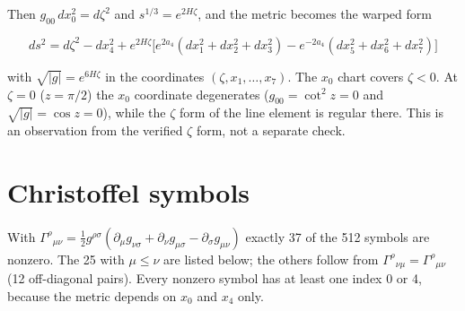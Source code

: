 \documentclass[11pt]{article}
\begin{document}
Then $g_{00}\,dx_0^2=d\zeta^2$ and $s^{1/3}=e^{2H\zeta}$, and the metric becomes the warped form

\[
ds^2=d\zeta^2-dx_4^2+e^{2H\zeta}\bigl[e^{2a_4}(dx_1^2+dx_2^2+dx_3^2)-e^{-2a_4}(dx_5^2+dx_6^2+dx_7^2)\bigr]
\]

with $\sqrt{|g|}=e^{6H\zeta}$ in the coordinates $(\zeta,x_1,\dots,x_7)$. The $x_0$ chart covers $\zeta<0$. At $\zeta=0$ ($z=\pi/2$) the $x_0$ coordinate degenerates ($g_{00}=\cot^2z=0$ and $\sqrt{|g|}=\cos z=0$), while the $\zeta$ form of the line element is regular there. This is an observation from the verified $\zeta$ form, not a separate check.

\section{Christoffel symbols}

With $\Gamma^\rho{}_{\mu\nu}=\tfrac12g^{\rho\sigma}(\partial_\mu g_{\nu\sigma}+\partial_\nu g_{\mu\sigma}-\partial_\sigma g_{\mu\nu})$ exactly 37 of the 512 symbols are nonzero. The 25 with $\mu\le\nu$ are listed below; the others follow from $\Gamma^\rho{}_{\nu\mu}=\Gamma^\rho{}_{\mu\nu}$ (12 off-diagonal pairs). Every nonzero symbol has at least one index 0 or 4, because the metric depends on $x_0$ and $x_4$ only.
\end{document}
